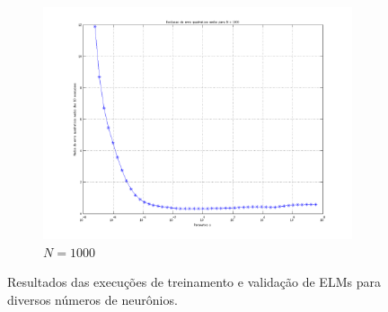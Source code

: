 \begin{figure}[H]
			\begin{subfigure}{.5\textwidth}
				  \centering
				  \includegraphics[width=1\linewidth]{image/elm_1000_neurons}
				  \caption{\(N=1000\)}
				  \label{fig:elm1000}  
				\end{subfigure}	
			
			\caption{Resultados das execuções de treinamento e validação de ELMs para diversos números de neurônios.}
			\label{fig:elms}
			\end{figure}
			
		\FloatBarrier